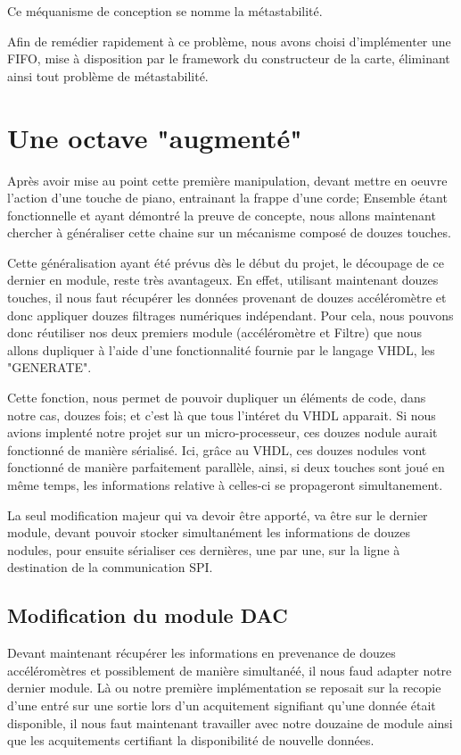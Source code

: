\documentclass[french,a4paper,12pt]{report}
\begin{document}
	Ce méquanisme de conception se nomme la métastabilité.
	
	Afin de remédier rapidement à ce problème, nous avons choisi d'implémenter une FIFO, mise à disposition par le framework du constructeur de la carte, éliminant ainsi tout problème de métastabilité.		
		
	\chapter{Une octave "augmenté"}
		Après avoir mise au point cette première manipulation, devant mettre en oeuvre l'action d'une touche de piano, entrainant la frappe d'une corde; Ensemble étant fonctionnelle et ayant démontré la preuve de concepte, nous allons maintenant chercher à généraliser cette chaine sur un mécanisme composé de douzes touches.
		
		Cette généralisation ayant été prévus dès le début du projet, le découpage de ce dernier en module, reste très avantageux. En effet, utilisant maintenant douzes touches, il nous faut récupérer les données provenant de douzes accéléromètre et donc appliquer douzes filtrages numériques indépendant. Pour cela, nous pouvons donc réutiliser nos deux premiers module (accéléromètre et Filtre) que nous allons dupliquer à l'aide d'une fonctionnalité fournie par le langage VHDL, les "GENERATE".
		
		Cette fonction, nous permet de pouvoir dupliquer un éléments de code, dans notre cas, douzes fois; et c'est là que tous l'intéret du VHDL apparait. Si nous avions implenté notre projet sur un micro-processeur, ces douzes nodule aurait fonctionné de manière sérialisé. Ici, grâce au VHDL, ces douzes nodules vont fonctionné de manière parfaitement parallèle, ainsi, si deux touches sont joué en même temps, les informations relative à celles-ci se propageront simultanement.
		
		La seul modification majeur qui va devoir être apporté, va être sur le dernier module, devant pouvoir stocker simultanément les informations de douzes nodules, pour ensuite sérialiser ces dernières, une par une, sur la ligne à destination de la communication SPI.
		
	\section{Modification du module DAC}
		Devant maintenant récupérer les informations en prevenance de douzes accéléromètres et possiblement de manière simultanéé, il nous faud adapter notre dernier module. Là ou notre première implémentation se reposait sur la recopie d'une entré sur une sortie lors d'un acquitement signifiant qu'une donnée était disponible, il nous faut maintenant travailler avec notre douzaine de module ainsi que les acquitements certifiant la disponibilité de nouvelle données.
		
\end{document}
